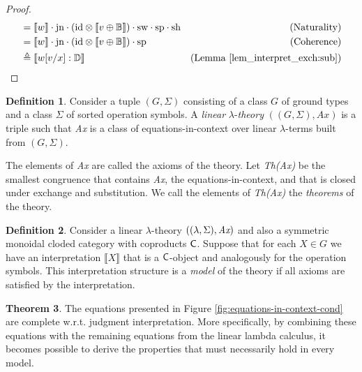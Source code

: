 \documentclass[10pt,a4paper]{amsart}
\theoremstyle{definition}
\newtheorem{definition}{Definition}[section]
\theoremstyle{definition}
\theoremstyle{definition}
\theoremstyle{definition}
\theoremstyle{definition}
\theoremstyle{definition}
\newtheorem{theorem}[definition]{Theorem}
\begin{document}
\begin{proof}
\begin{align*}
  & = \llbracket w \rrbracket \cdot \text{jn} \cdot ( \text{id} \otimes \llbracket v \oplus \mathbb{B}\rrbracket )  \cdot  \mathrm{sw}  \cdot  \text{sp} \cdot \text{sh} & {\text{(Naturality)}}\\
  &  = \llbracket w \rrbracket \cdot \text{jn} \cdot ( \text{id} \otimes \llbracket v \oplus \mathbb{B}\rrbracket )  \cdot  \text{sp} & {\text{(Coherence)}}\\
  & \triangleq \llbracket w[v/x] : \mathbb{D} \rrbracket & {\text{(Lemma \ref{lem_interpret_exch:sub})}}
\end{align*}
\end{proof}

\begin{definition}
  Consider a tuple $(G, \Sigma)$ consisting of a class $G$ of ground types and a class $\Sigma$ of sorted operation symbols. A \emph{linear} $\lambda$-\emph{theory} $((G, \Sigma), \textit{Ax})$ is a triple such that \emph{Ax} is a class of equations-in-context over linear $\lambda$-terms built from $(G, \Sigma)$.
\end{definition}

The elements of \emph{Ax} are called the axioms of the theory. Let \emph{Th(Ax)}  be the smallest congruence that contains \emph{Ax}, the equations-in-context, and that is closed under exchange
and substitution. We call the elements of  \emph{Th(Ax)} the \emph{theorems} of the theory.

\begin{definition}
  Consider a linear $\lambda$-theory $((\lambda, \Sigma), \emph{Ax})$ and
  also a symmetric monoidal cloded category with coproducts $\mathsf{C}$. Suppose that for each $X \in G$ we have an interpretation $\llbracket X \rrbracket$
  that is a $\mathsf{C}$-object and analogously for the operation symbols. This interpretation structure
  is a \emph{model} of the theory if all axioms are satisfied by the interpretation.
\end{definition}

\begin{theorem} \label {theorem:comp_eq_in_context}
  The equations presented in Figure \ref{fig:equations-in-context-cond} are complete w.r.t. judgment interpretation. More specifically, by combining these equations with the remaining equations from the linear lambda calculus, it becomes possible to derive the properties that must necessarily hold in every model.
\end{theorem}
\end{document}
